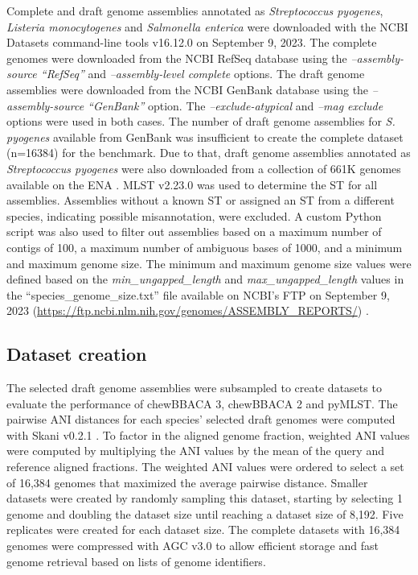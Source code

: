 Complete and draft genome assemblies annotated as \textit{Streptococcus pyogenes}, \textit{Listeria monocytogenes} and \textit{Salmonella enterica} were downloaded with the \ac{NCBI} Datasets command-line tools v16.12.0 \citep{oleary_exploring_2024} on September 9, 2023. The complete genomes were downloaded from the \ac{NCBI} RefSeq database \citep{sayers_database_2022} using the \textit{–assembly-source “RefSeq”} and \textit{–assembly-level complete} options. The draft genome assemblies were downloaded from the \ac{NCBI} GenBank database \citep{sayers_database_2022} using the \textit{–assembly-source “GenBank”} option. The \textit{–exclude-atypical} and \textit{–mag exclude} options were used in both cases. The number of draft genome assemblies for \textit{S. pyogenes} available from GenBank was insufficient to create the complete dataset (n=16384) for the benchmark. Due to that, draft genome assemblies annotated as \textit{Streptococcus pyogenes} were also downloaded from a collection of 661K genomes available on the \ac{ENA} \citep{blackwell_exploring_2021}. MLST v2.23.0 \citep{jolley_bigsdb_2010, seemann_mlst_nodate} was used to determine the \ac{ST} for all assemblies. Assemblies without a known \ac{ST} or assigned an \ac{ST} from a different species, indicating possible misannotation, were excluded. A custom Python script was also used to filter out assemblies based on a maximum number of contigs of 100, a maximum number of ambiguous bases of 1000, and a minimum and maximum genome size. The minimum and maximum genome size values were defined based on the \textit{min\_ungapped\_length} and \textit{max\_ungapped\_length} values in the “species\_genome\_size.txt” file available on \ac{NCBI}’s FTP on September 9, 2023 (\url{https://ftp.ncbi.nlm.nih.gov/genomes/ASSEMBLY_REPORTS/}) \citep{sayers_database_2022}.

\subsection{Dataset creation} \label{ssec:ch2_methods_ssec2}

The selected draft genome assemblies were subsampled to create datasets to evaluate the performance of chewBBACA 3, chewBBACA 2 and pyMLST. The pairwise \ac{ANI} distances for each species’ selected draft genomes were computed with Skani v0.2.1 \citep{shaw_fast_2023}. To factor in the aligned genome fraction, weighted \ac{ANI} values were computed by multiplying the \ac{ANI} values by the mean of the query and reference aligned fractions. The weighted \ac{ANI} values were ordered to select a set of 16,384 genomes that maximized the average pairwise distance. Smaller datasets were created by randomly sampling this dataset, starting by selecting 1 genome and doubling the dataset size until reaching a dataset size of 8,192. Five replicates were created for each dataset size. The complete datasets with 16,384 genomes were compressed with AGC v3.0 \citep{deorowicz_agc_2023} to allow efficient storage and fast genome retrieval based on lists of genome identifiers.

